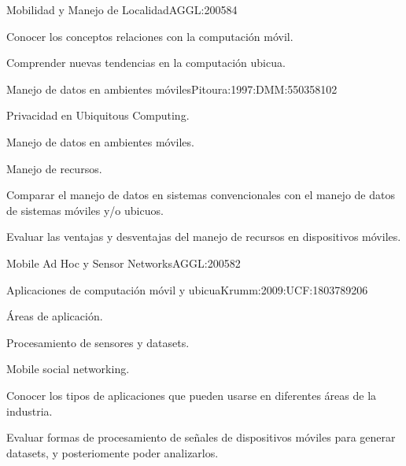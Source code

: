 \begin{syllabus}
\begin{unit}{Mobilidad y Manejo de Localidad}{AGGL:2005}{8}{4}
  \begin{learningoutcomes}
     \item Conocer los conceptos relaciones con la computación móvil.
     \item Comprender nuevas tendencias en la computación ubicua.
  \end{learningoutcomes}

\end{unit}

\begin{unit}{Manejo de datos en ambientes móviles}{Pitoura:1997:DMM:550358}{10}{2}
   \begin{topics}
     \item Privacidad en Ubiquitous Computing.
     \item Manejo de datos en ambientes móviles.
     \item Manejo de recursos.
   \end{topics}

   \begin{learningoutcomes}
     \item Comparar el manejo de datos en sistemas convencionales con el manejo de datos de sistemas móviles y/o ubicuos.
     \item Evaluar las ventajas y desventajas del manejo de recursos en dispositivos móviles.
  \end{learningoutcomes}
\end{unit}

\begin{unit}{Mobile Ad Hoc y Sensor Networks}{AGGL:2005}{8}{2}
        \NCMobileComputingAllTopics
        \NCMobileComputingAllObjectives
\end{unit}

\begin{unit}{Aplicaciones de computación móvil y ubicua}{Krumm:2009:UCF:1803789}{20}{6}
   \begin{topics}
     \item Áreas de aplicación.
     \item Procesamiento de sensores y datasets.
     \item Mobile social networking.
   \end{topics}
   \begin{learningoutcomes}
     \item Conocer los tipos de aplicaciones que pueden usarse en diferentes áreas de la industria.
     \item Evaluar formas de procesamiento de señales de dispositivos móviles para generar datasets, y posteriomente poder analizarlos.
  \end{learningoutcomes}

\end{unit}



\begin{coursebibliography}
\end{coursebibliography}

\end{syllabus}

%
